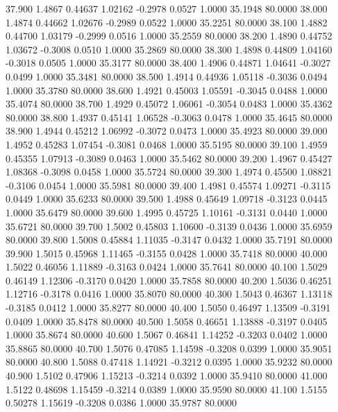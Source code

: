   37.900   1.4867   0.44637   1.02162  -0.2978   0.0527   1.0000  35.1948  80.0000
  38.000   1.4874   0.44662   1.02676  -0.2989   0.0522   1.0000  35.2251  80.0000
  38.100   1.4882   0.44700   1.03179  -0.2999   0.0516   1.0000  35.2559  80.0000
  38.200   1.4890   0.44752   1.03672  -0.3008   0.0510   1.0000  35.2869  80.0000
  38.300   1.4898   0.44809   1.04160  -0.3018   0.0505   1.0000  35.3177  80.0000
  38.400   1.4906   0.44871   1.04641  -0.3027   0.0499   1.0000  35.3481  80.0000
  38.500   1.4914   0.44936   1.05118  -0.3036   0.0494   1.0000  35.3780  80.0000
  38.600   1.4921   0.45003   1.05591  -0.3045   0.0488   1.0000  35.4074  80.0000
  38.700   1.4929   0.45072   1.06061  -0.3054   0.0483   1.0000  35.4362  80.0000
  38.800   1.4937   0.45141   1.06528  -0.3063   0.0478   1.0000  35.4645  80.0000
  38.900   1.4944   0.45212   1.06992  -0.3072   0.0473   1.0000  35.4923  80.0000
  39.000   1.4952   0.45283   1.07454  -0.3081   0.0468   1.0000  35.5195  80.0000
  39.100   1.4959   0.45355   1.07913  -0.3089   0.0463   1.0000  35.5462  80.0000
  39.200   1.4967   0.45427   1.08368  -0.3098   0.0458   1.0000  35.5724  80.0000
  39.300   1.4974   0.45500   1.08821  -0.3106   0.0454   1.0000  35.5981  80.0000
  39.400   1.4981   0.45574   1.09271  -0.3115   0.0449   1.0000  35.6233  80.0000
  39.500   1.4988   0.45649   1.09718  -0.3123   0.0445   1.0000  35.6479  80.0000
  39.600   1.4995   0.45725   1.10161  -0.3131   0.0440   1.0000  35.6721  80.0000
  39.700   1.5002   0.45803   1.10600  -0.3139   0.0436   1.0000  35.6959  80.0000
  39.800   1.5008   0.45884   1.11035  -0.3147   0.0432   1.0000  35.7191  80.0000
  39.900   1.5015   0.45968   1.11465  -0.3155   0.0428   1.0000  35.7418  80.0000
  40.000   1.5022   0.46056   1.11889  -0.3163   0.0424   1.0000  35.7641  80.0000
  40.100   1.5029   0.46149   1.12306  -0.3170   0.0420   1.0000  35.7858  80.0000
  40.200   1.5036   0.46251   1.12716  -0.3178   0.0416   1.0000  35.8070  80.0000
  40.300   1.5043   0.46367   1.13118  -0.3185   0.0412   1.0000  35.8277  80.0000
  40.400   1.5050   0.46497   1.13509  -0.3191   0.0409   1.0000  35.8478  80.0000
  40.500   1.5058   0.46651   1.13888  -0.3197   0.0405   1.0000  35.8674  80.0000
  40.600   1.5067   0.46841   1.14252  -0.3203   0.0402   1.0000  35.8865  80.0000
  40.700   1.5076   0.47085   1.14598  -0.3208   0.0399   1.0000  35.9051  80.0000
  40.800   1.5088   0.47418   1.14921  -0.3212   0.0395   1.0000  35.9232  80.0000
  40.900   1.5102   0.47906   1.15213  -0.3214   0.0392   1.0000  35.9410  80.0000
  41.000   1.5122   0.48698   1.15459  -0.3214   0.0389   1.0000  35.9590  80.0000
  41.100   1.5155   0.50278   1.15619  -0.3208   0.0386   1.0000  35.9787  80.0000

